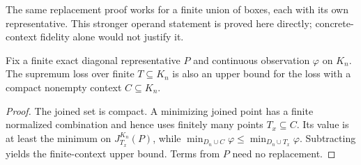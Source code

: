 The same replacement proof works for a finite union of boxes, each with its own representative. This stronger operand statement is proved here directly; concrete-context fidelity alone would not justify it.

\begin{lemma}\label{lem:compact-context}
Fix a finite exact diagonal representative $P$ and continuous observation $\varphi$ on $K_n$. The supremum loss over finite $T\subseteq K_n$ is also an upper bound for the loss with a compact nonempty context $C\subseteq K_n$.
\end{lemma}
\begin{proof}
The joined set is compact. A minimizing joined point has a finite normalized combination and hence uses finitely many points $T_x\subseteq C$. Its value is at least the minimum on $J_{T_x}^{K_n}(P)$, while $\min_{D_n\cup C}\varphi\le\min_{D_n\cup T_x}\varphi$. Subtracting yields the finite-context upper bound. Terms from $P$ need no replacement.
\end{proof}

